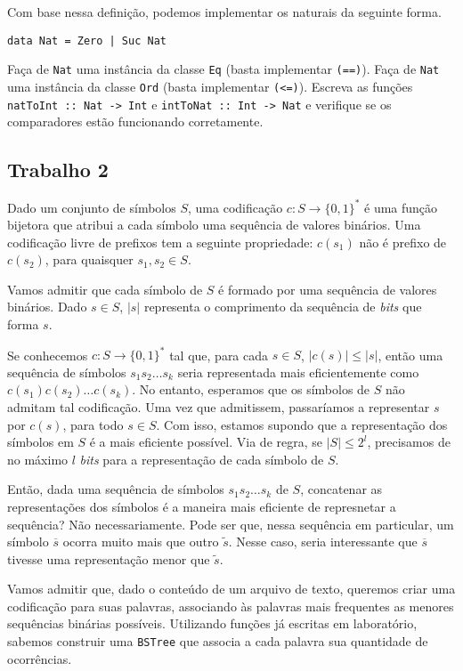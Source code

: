 \documentclass[a4paper]{article}
\begin{document}
Com base nessa definição, podemos implementar os naturais da seguinte forma.

\begin{verbatim}
data Nat = Zero | Suc Nat
\end{verbatim}

Faça de \texttt{Nat} uma instância da classe \texttt{Eq} (basta implementar \texttt{(==)}).
Faça de \texttt{Nat} uma instância da classe \texttt{Ord} (basta implementar \texttt{(<=)}).
Escreva as funções \texttt{natToInt :: Nat -> Int} e \texttt{intToNat :: Int -> Nat} e verifique se os comparadores estão funcionando corretamente.

\subsection{Trabalho 2}

Dado um conjunto de símbolos $S$, uma codificação $c : S \to \{0, 1\}^*$ é uma função bijetora que atribui a cada símbolo uma sequência de valores binários.
Uma codificação livre de prefixos tem a seguinte propriedade: $c(s_1)$ não é prefixo de $c(s_2)$, para quaisquer $s_1, s_2 \in S$.

Vamos admitir que cada símbolo de $S$ é formado por uma sequência de valores binários.
Dado $s \in S$, $|s|$ representa o comprimento da sequência de \emph{bits} que forma $s$.

Se conhecemos $c : S \to \{0, 1\}^*$ tal que, para cada $s \in S$, $|c(s)| \leq |s|$, então uma sequência de símbolos $s_1s_2\dots s_k$ seria representada mais eficientemente como $c(s_1)c(s_2)\dots c(s_k)$.
No entanto, esperamos que os símbolos de $S$ não admitam tal codificação.
Uma vez que admitissem, passaríamos a representar $s$ por $c(s)$, para todo $s \in S$.
Com isso, estamos supondo que a representação dos símbolos em $S$ é a mais eficiente possível.
Via de regra, se $|S| \leq 2^l$, precisamos de no máximo $l$ \emph{bits} para a representação de cada símbolo de $S$.

Então, dada uma sequência de símbolos $s_1s_2 \dots s_k$ de $S$, concatenar as representações dos símbolos é a maneira mais eficiente de represnetar a sequência?
Não necessariamente.
Pode ser que, nessa sequência em particular, um símbolo $\overline{s}$ ocorra muito mais que outro $\tilde{s}$.
Nesse caso, seria interessante que $\overline{s}$ tivesse uma representação menor que $\tilde{s}$.

Vamos admitir que, dado o conteúdo de um arquivo de texto, queremos criar uma codificação para suas palavras, associando às palavras mais frequentes as menores sequências binárias possíveis.
Utilizando funções já escritas em laboratório, sabemos construir uma \texttt{BSTree} que associa a cada palavra sua quantidade de ocorrências.
\end{document}
